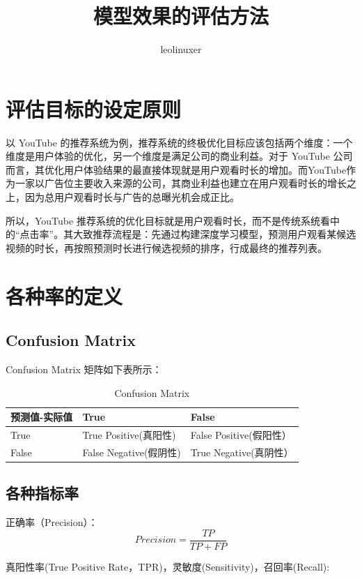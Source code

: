 \documentclass[12pt]{article}
\title{模型效果的评估方法}
\author{leolinuxer}
\begin{document}
\maketitle
\tableofcontents

\section{评估目标的设定原则\cite{Deep_Learning_Recommender_System}}
以 YouTube 的推荐系统为例，推荐系统的终极优化目标应该包括两个维度：一个维度是用户体验的优化，另一个维度是满足公司的商业利益。对于 YouTube 公司而言，其优化用户体验结果的最直接体现就是用户观看时长的增加。而YouTube作为一家以广告位主要收入来源的公司，其商业利益也建立在用户观看时长的增长之上，因为总用户观看时长与广告的总曝光机会成正比。

所以，YouTube 推荐系统的优化目标就是用户观看时长，而不是传统系统看中的“点击率”。其大致推荐流程是：先通过构建深度学习模型，预测用户观看某候选视频的时长，再按照预测时长进行候选视频的排序，行成最终的推荐列表。

\section{各种率的定义}
\subsection{Confusion Matrix}
Confusion Matrix 矩阵如下表所示：

\begin{table}[h]
\begin{center}  
\begin{tabular}{|l|l|l|}  
\hline  
预测值-实际值 & True & False \\ \hline  
True &	True Positive(真阳性) &	False Positive(假阳性）\\  \hline
False &	False Negative(假阴性) & True Negative(真阴性）\\  \hline
\end{tabular}  
\end{center}
\caption{Confusion Matrix} 
\end{table}

\subsection{各种指标率}
正确率（Precision）：
$$Precision = \frac{TP}{TP+FP}$$

真阳性率(True Positive Rate，TPR)，灵敏度(Sensitivity)，召回率(Recall):
\end{document}

